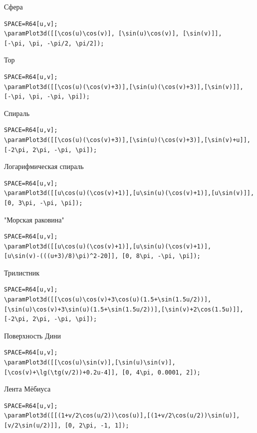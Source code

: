 Сфера

\begin{verbatim}
SPACE=R64[u,v];
\paramPlot3d([[\cos(u)\cos(v)], [\sin(u)\cos(v)], [\sin(v)]], 
[-\pi, \pi, -\pi/2, \pi/2]);
\end{verbatim}

Тор

\begin{verbatim}
SPACE=R64[u,v];
\paramPlot3d([[\cos(u)(\cos(v)+3)],[\sin(u)(\cos(v)+3)],[\sin(v)]], 
[-\pi, \pi, -\pi, \pi]);
\end{verbatim}

Спираль

\begin{verbatim}
SPACE=R64[u,v];
\paramPlot3d([[\cos(u)(\cos(v)+3)],[\sin(u)(\cos(v)+3)],[\sin(v)+u]], 
[-2\pi, 2\pi, -\pi, \pi]);
\end{verbatim}

Логарифмическая спираль

\begin{verbatim}
SPACE=R64[u,v];
\paramPlot3d([[u\cos(u)(\cos(v)+1)],[u\sin(u)(\cos(v)+1)],[u\sin(v)]], 
[0, 3\pi, -\pi, \pi]);
\end{verbatim}

"Морская раковина"

\begin{verbatim}
SPACE=R64[u,v];
\paramPlot3d([[u\cos(u)(\cos(v)+1)],[u\sin(u)(\cos(v)+1)],
[u\sin(v)-(((u+3)/8)\pi)^2-20]], [0, 8\pi, -\pi, \pi]);
\end{verbatim}

Трилистник

\begin{verbatim}
SPACE=R64[u,v];
\paramPlot3d([[\cos(u)\cos(v)+3\cos(u)(1.5+\sin(1.5u/2))],
[\sin(u)\cos(v)+3\sin(u)(1.5+\sin(1.5u/2))],[\sin(v)+2\cos(1.5u)]], 
[-2\pi, 2\pi, -\pi, \pi]);
\end{verbatim}

Поверхность Дини

\begin{verbatim}
SPACE=R64[u,v];
\paramPlot3d([[\cos(u)\sin(v)],[\sin(u)\sin(v)],
[\cos(v)+\lg(\tg(v/2))+0.2u-4]], [0, 4\pi, 0.0001, 2]);
\end{verbatim}

Лента Мёбиуса

\begin{verbatim}
SPACE=R64[u,v];
\paramPlot3d([[(1+v/2\cos(u/2))\cos(u)],[(1+v/2\cos(u/2))\sin(u)],
[v/2\sin(u/2)]], [0, 2\pi, -1, 1]);
\end{verbatim}

